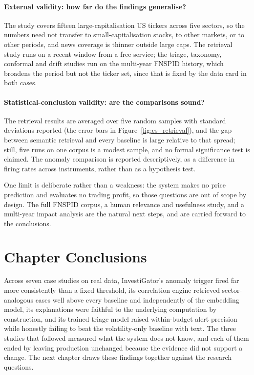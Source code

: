 \paragraph{External validity: how far do the findings generalise?} The study covers fifteen
large-capitalisation US tickers across five sectors, so the numbers need not transfer to
small-capitalisation stocks, to other markets, or to other periods, and news coverage is thinner outside
large caps. The retrieval study runs on a recent window from a free service; the triage, taxonomy,
conformal and drift studies run on the multi-year FNSPID history, which broadens the
period but not the ticker set, since that is fixed by the data card in both cases.

\paragraph{Statistical-conclusion validity: are the comparisons sound?} The retrieval results are
averaged over five random samples with standard deviations reported (the error bars in
Figure~\ref{fig:cs_retrieval}), and the gap between semantic retrieval and every baseline is large
relative to that spread; still, five runs on one corpus is a modest sample, and no formal significance
test is claimed. The anomaly comparison is reported descriptively, as a difference in firing rates across
instruments, rather than as a hypothesis test.

One limit is deliberate rather than a weakness: the system makes no price prediction and evaluates no
trading profit, so those questions are out of scope by design. The full FNSPID corpus, a human relevance
and usefulness study, and a multi-year impact analysis are the natural next steps, and are carried forward
to the conclusions.

\section{Chapter Conclusions}
\label{sec:cs_summary}

Across seven case studies on real data, InvestiGator's anomaly trigger fired far more consistently than
a fixed threshold, its correlation engine retrieved sector-analogous cases well above every
baseline and independently of the embedding model, its explanations were faithful to the underlying
computation by construction, and its trained triage model raised within-budget alert
precision while honestly failing to beat the volatility-only baseline with text. The three studies that
followed measured what the system does not know, and each of them ended by leaving production
unchanged because the evidence did not support a change. The next chapter draws these findings
together against the research questions.

